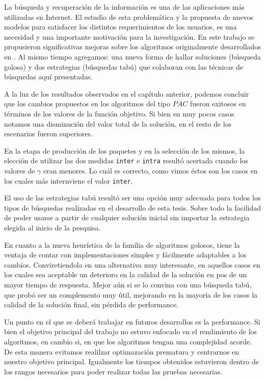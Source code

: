 La búsqueda y recuperación de la información es una de las aplicaciones más utilizadas en Internet. El estudio de esta problemática y la propuesta de nuevos modelos para satisfacer los distintos requerimientos de los usuarios, es una necesidad y una importante motivación para la investigación. En este trabajo se propusieron significativas mejoras sobre los algoritmos originalmente desarrollados en \cite{journals/tkde/Amer-YahiaBCFMZ14}. Al mismo tiempo agregamos: una nueva forma de hallar soluciones (búsqueda golosa) y dos estrategias (búsquedas tabú) que colaboran con las técnicas de búsquedas aquí presentadas.

A la luz de los resultados observados en el capítulo anterior, podemos concluir que los cambios propuestos en los algoritmos del tipo $PAC$ fueron exitosos en términos de los valores de la función objetivo. Si bien en muy pocos casos notamos una disminución del valor total de la solución, en el resto de los escenarios fueron superiores. 

En la etapa de producción de los paquetes y en la selección de los mismos, la elección de utilizar las dos medidas \texttt{inter} e \texttt{intra} resultó acertada cuando los valores de $\gamma$ eran menores. Lo cuál es correcto, como vimos éstos son los casos en los cuales más internviene el valor \texttt{inter}.

El uso de las estrategias tabú resultó ser una opción muy adecuada para todos los tipos de búsquedas realizadas en el desarrollo de esta tesis. Sobre todo la facilidad de poder usarse a partir de cualquier solución inicial sin importar la estrategia elegida al inicio de la pesquisa.

En cuanto a la nueva heurística de la familia de algoritmos golosos, tiene la ventaja de contar con implementaciones simples y fácilmente adaptables a los cambios. Conviretiendola en una alternativa muy interesante, en aquellos casos en los cuales sea aceptable un deterioro en la calidad de la solución en pos de un mayor tiempo de respuesta. Mejor aún si se lo convina con una búsqueda tabú, que probó ser un complemento muy útil, mejorando en la mayoría de los casos la calidad de la solución final, sin pérdida de performance. 

Un punto en el que se deberá trabajar en futuros desarrollos es la performance. Si bien el objetivo principal del trabajo no estuvo enfocado en el rendimiento de los algoritmos, en cambio si, en que los algoritmos tengan una complejidad acorde. De esta manera evitamos realilzar optimazación prematura y centrarnos en nuestro objetivo principal. Igualmente los tiempos obtenidos estuvieron dentro de los rangos necesarios para poder realizar todas las pruebas necesarias.

